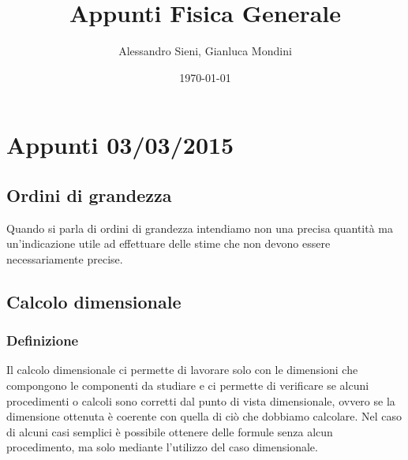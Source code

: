 \documentclass[fontsize = 20px, paper = a4]{article}
\author{Alessandro Sieni, Gianluca Mondini}
\title{Appunti Fisica Generale}
\date{\today}
\begin{document}
\maketitle
\newpage
\tableofcontents
\newpage
\section{Appunti 03/03/2015}
\subsection{Ordini di grandezza}
Quando si parla di ordini di grandezza intendiamo non una precisa quantità ma un'indicazione utile ad effettuare delle stime che non devono essere necessariamente precise.
\subsection{Calcolo dimensionale}
\subsubsection{Definizione}
Il calcolo dimensionale ci permette di lavorare solo con le dimensioni che compongono le componenti da studiare e ci permette di verificare se alcuni procedimenti o calcoli sono corretti dal punto di vista dimensionale, ovvero se la dimensione ottenuta è coerente con quella di ciò che dobbiamo calcolare.
Nel caso di alcuni casi semplici è possibile ottenere delle formule senza alcun procedimento, ma solo mediante l'utilizzo del caso dimensionale.
\end{document}
